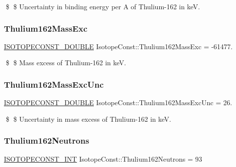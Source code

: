 \$ \$ Uncertainty in binding energy per A of Thulium-\/162 in keV. \mbox{\label{group___isotope_const-_thulium-_tm162_ga2c0ce40eb222ad4d6b84a2eef63a79c3}} 
\subsubsection{\texorpdfstring{Thulium162\+Mass\+Exc}{Thulium162MassExc}}
{\footnotesize\ttfamily \mbox{\hyperlink{group___isotope_const-_macros_ga8f45a7272ce02c0b4c65c44636ed719a}{I\+S\+O\+T\+O\+P\+E\+C\+O\+N\+S\+T\+\_\+\+D\+O\+U\+B\+LE}} Isotope\+Const\+::\+Thulium162\+Mass\+Exc = -\/61477.}

\$ \$ Mass excess of Thulium-\/162 in keV. \mbox{\label{group___isotope_const-_thulium-_tm162_ga6eb5e383fe7f1532840a60a05c18d3c1}} 
\subsubsection{\texorpdfstring{Thulium162\+Mass\+Exc\+Unc}{Thulium162MassExcUnc}}
{\footnotesize\ttfamily \mbox{\hyperlink{group___isotope_const-_macros_ga8f45a7272ce02c0b4c65c44636ed719a}{I\+S\+O\+T\+O\+P\+E\+C\+O\+N\+S\+T\+\_\+\+D\+O\+U\+B\+LE}} Isotope\+Const\+::\+Thulium162\+Mass\+Exc\+Unc = 26.}

\$ \$ Uncertainty in mass excess of Thulium-\/162 in keV. \mbox{\label{group___isotope_const-_thulium-_tm162_ga6243b0c53ded6706b03f92bb6fee4963}} 
\subsubsection{\texorpdfstring{Thulium162\+Neutrons}{Thulium162Neutrons}}
{\footnotesize\ttfamily \mbox{\hyperlink{group___isotope_const-_macros_ga5f18360b3e99483a35c32d789e62621c}{I\+S\+O\+T\+O\+P\+E\+C\+O\+N\+S\+T\+\_\+\+I\+NT}} Isotope\+Const\+::\+Thulium162\+Neutrons = 93}

